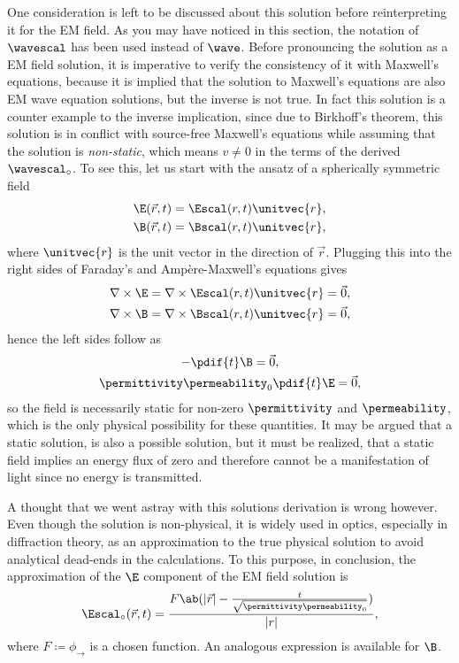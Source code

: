 One consideration is left to be discussed about this solution before reinterpreting it for the \ac{EM} field.
As you may have noticed in this section, the notation of \(\wavescal\) has been used instead of \(\wave\).
Before pronouncing the solution as a \ac{EM} field solution, it is imperative to verify the consistency of it with
    Maxwell's equations, because it is implied that the solution to Maxwell's equations are also \ac{EM} wave equation 
    solutions, but the inverse is not true.
In fact this solution is a counter example to the inverse implication, since due to Birkhoff's theorem, this solution is
    in conflict with source-free Maxwell's equations while assuming that the solution is \emph{non-static}, which means 
    \(v \neq 0\) in the terms of the derived \(\wavescal_\circ\).
To see this, let us start with the ansatz of a spherically symmetric field
    \begin{gather*}
    \E(\vec{r}, t) = \Escal(r,t) \unitvec{r}, \\
    \B(\vec{r}, t) = \Bscal(r,t) \unitvec{r},
    \end{gather*}
    where \(\unitvec{r}\) is the unit vector in the direction of \(\vec{r}\).
Plugging this into the right sides of Faraday's and Ampère-Maxwell's equations gives
    \begin{gather*}
        \nabla \times \E = \nabla \times \Escal(r,t) \unitvec{r} = \vec{0}, \\
        \nabla \times \B = \nabla \times \Bscal(r,t) \unitvec{r} = \vec{0},
    \end{gather*}
    hence the left sides follow as
    \begin{gather*}
    - \pdif{t}\B = \vec{0}, \\
    \permittivity\permeability_0\pdif{t}\E = \vec{0},
    \end{gather*}
    so the field is necessarily static for non-zero \(\permittivity\) and \(\permeability\), which is the only physical
    possibility for these quantities.
It may be argued that a static solution, is also a possible solution, but it must be realized, that a static field
    implies an energy flux of zero and therefore cannot be a manifestation of light since no energy is transmitted.

A thought that we went astray with this solutions derivation is wrong however.
Even though the solution is non-physical, it is widely used in optics, especially in diffraction theory, as an
    approximation to the true physical solution to avoid analytical dead-ends in the calculations.
To this purpose, in conclusion, the approximation of the \(\E\) component of the \ac{EM} field solution is
    \begin{equation*}
      \Escal_{\circ}(\vec{r},t)  = \frac{F\ab(|\vec{r}| - \frac{t}{\sqrt{\permittivity\permeability_0}})}{|r|},
    \end{equation*}
    where \(F \coloneqq \phi_{\rightarrow}\) is a chosen function.
An analogous expression is available for \(\B\).

